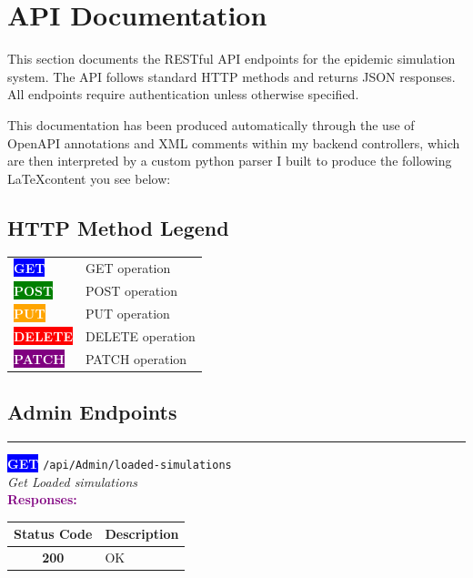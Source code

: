 \section{API Documentation}
\label{APIDocs}
This section documents the RESTful API endpoints for the epidemic simulation system. 
The API follows standard HTTP methods and returns JSON responses. 
All endpoints require authentication unless otherwise specified.

This documentation has been produced automatically through the use of OpenAPI annotations and XML comments within my backend controllers, which are then interpreted by a custom python parser I built to produce the following \LaTeX content you see below:
\vspace{1em}
\subsection*{HTTP Method Legend}
\begin{tcolorbox}[colback=gray!5, colframe=gray!50, arc=2mm]
\begin{tabular}{ll}
\colorbox{blue}{\textcolor{white}{\textbf{GET}}} & GET operation \\[0.2em]
\colorbox{green}{\textcolor{white}{\textbf{POST}}} & POST operation \\[0.2em]
\colorbox{orange}{\textcolor{white}{\textbf{PUT}}} & PUT operation \\[0.2em]
\colorbox{red}{\textcolor{white}{\textbf{DELETE}}} & DELETE operation \\[0.2em]
\colorbox{purple}{\textcolor{white}{\textbf{PATCH}}} & PATCH operation \\[0.2em]
\end{tabular}
\end{tcolorbox}
\vspace{1.5em}
\subsection{Admin Endpoints}

\noindent\textcolor{gray!60}{\rule{\linewidth}{0.5pt}}
\vspace{0.5em}

\begin{tcolorbox}[
    colback=blue!5,
    colframe=blue,
    arc=2mm,
    boxrule=1pt,
    left=5pt,
    right=5pt,
    top=5pt,
    bottom=5pt
]
\noindent\colorbox{blue}{\textcolor{white}{\textbf{GET}}} 
\texttt{\large /api/Admin/loaded-simulations}\\[0.3em]
\textit{Get Loaded simulations}\\[0.3em]
\vspace{0.3em}
\textbf{\textcolor{purple}{Responses:}}\\[0.2em]
\begin{tabular}{|c|p{10cm}|}
\hline
\rowcolor{gray!20}
\textbf{Status Code} & \textbf{Description} \\ \hline
\colorbox{green!20}{\textbf{200}} & OK \\ \hline
\end{tabular}
\end{tcolorbox}
\vspace{0.5em}

